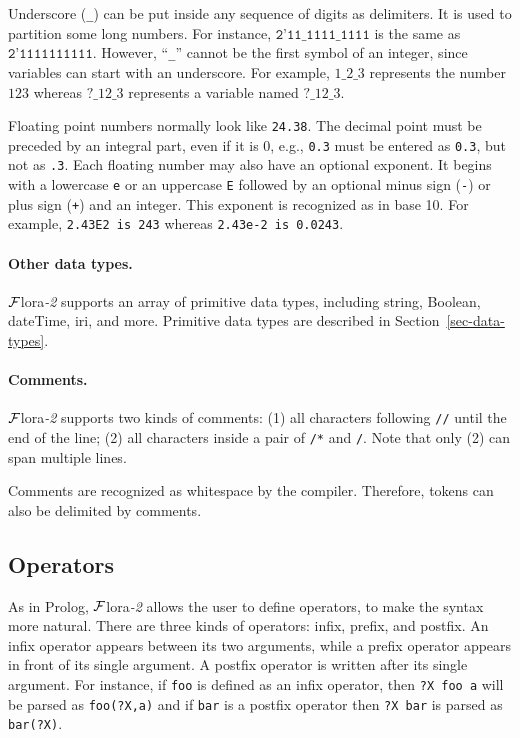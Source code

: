 \documentclass[11pt]{article}
\newcommand{\FLORA}{{\mbox{\sc ${\cal F}${lora}\rm\emph{-2}}}\xspace}
\newcommand{\FLSYSTEM}{\FLORA}
\begin{document}
Underscore (\texttt{\_}) can be put inside any sequence of digits as
delimiters. It is used to partition some long numbers. For instance,
$\texttt{2'11\_1111\_1111}$ is the same as $\texttt{2'1111111111}$.
However, ``\texttt{\_}'' cannot be the first symbol of an integer, since
variables can start with an underscore. For example, $1\_2\_3$ represents
the number $123$ whereas $?\_12\_3$ represents a variable named $?\_12\_3$.

Floating point numbers normally look like {\tt 24.38}. The decimal point
must be preceded by an integral part, even if it is 0, e.g., {\tt 0.3}
must be entered as {\tt 0.3}, but not as {\tt .3}. Each floating
number may also have an optional exponent. It begins with a lowercase
{\tt e} or an uppercase {\tt E} followed by an optional minus sign
({\tt -}) or plus sign ({\tt +}) and an integer. This exponent is
recognized as in base 10. For example,
\mbox{\tt 2.43E2 is 243} whereas
\mbox{\tt 2.43e-2 is 0.0243}.

\paragraph{Other data types.}
\FLSYSTEM supports an array of primitive data types, including string, Boolean,
dateTime, iri, and more. Primitive data types are described in
Section~\ref{sec-data-types}.

\paragraph{Comments.}

%
\FLSYSTEM supports two kinds of comments: (1) all characters following
{\tt //} until the end of the line; (2) all characters inside a pair of
{\tt /*} and {\tt */}. Note that only (2) can span multiple lines.

Comments are recognized as whitespace by the compiler.  Therefore,
tokens can also be delimited by comments.


\subsection{Operators}


As in Prolog, \FLSYSTEM allows the user to define operators, to make the
syntax more natural.
There are three kinds of operators: infix,
prefix, and postfix. An infix operator appears between its two arguments,
while a prefix operator appears in front of its single argument. A postfix
operator is written
after its single argument. For instance, if {\tt foo} is defined as an
infix operator, then {\tt ?X foo a} will be parsed as {\tt foo(?X,a)} and if
{\tt bar} is a postfix operator then {\tt ?X bar} is parsed as {\tt bar(?X)}. 
\end{document}
